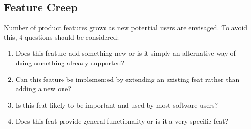 \subsection{Feature Creep}
Number of product features grows as new potential users are envisaged.
To avoid this, 4 questions should be considered:
\begin{enumerate}
    \item Does this feature add something new or is it simply an alternative way of doing something already supported?
    \item Can this feature be implemented by extending an existing feat rather than adding a new one?
    \item Is this feat likely to be important and used by most software users?
    \item Does this feat provide general functionality or is it a very specific feat?
\end{enumerate}
